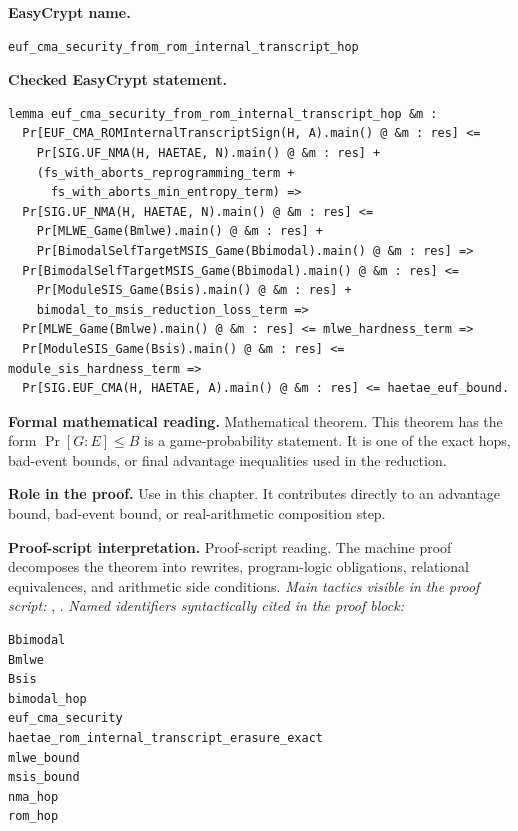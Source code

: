 \begin{formaltheorem}
\noindent\textbf{EasyCrypt name.}
\begin{lstlisting}[language=EasyCrypt,basicstyle=\ttfamily\scriptsize]
euf_cma_security_from_rom_internal_transcript_hop
\end{lstlisting}
\noindent\textbf{Checked EasyCrypt statement.}
\begin{lstlisting}[language=EasyCrypt,basicstyle=\ttfamily\scriptsize]
lemma euf_cma_security_from_rom_internal_transcript_hop &m :
  Pr[EUF_CMA_ROMInternalTranscriptSign(H, A).main() @ &m : res] <=
    Pr[SIG.UF_NMA(H, HAETAE, N).main() @ &m : res] +
    (fs_with_aborts_reprogramming_term +
      fs_with_aborts_min_entropy_term) =>
  Pr[SIG.UF_NMA(H, HAETAE, N).main() @ &m : res] <=
    Pr[MLWE_Game(Bmlwe).main() @ &m : res] +
    Pr[BimodalSelfTargetMSIS_Game(Bbimodal).main() @ &m : res] =>
  Pr[BimodalSelfTargetMSIS_Game(Bbimodal).main() @ &m : res] <=
    Pr[ModuleSIS_Game(Bsis).main() @ &m : res] +
    bimodal_to_msis_reduction_loss_term =>
  Pr[MLWE_Game(Bmlwe).main() @ &m : res] <= mlwe_hardness_term =>
  Pr[ModuleSIS_Game(Bsis).main() @ &m : res] <= module_sis_hardness_term =>
  Pr[SIG.EUF_CMA(H, HAETAE, A).main() @ &m : res] <= haetae_euf_bound.
\end{lstlisting}
\noindent\textbf{Formal mathematical reading.}
Mathematical theorem. This theorem has the form \(\Pr[G:E] \le B\) is a game-probability statement.  It is one of the exact hops, bad-event bounds, or final advantage inequalities used in the reduction.

\noindent\textbf{Role in the proof.}
Use in this chapter. It contributes directly to an advantage bound, bad-event bound, or real-arithmetic composition step.

\noindent\textbf{Proof-script interpretation.}
Proof-script reading. The machine proof decomposes the theorem into rewrites, program-logic obligations, relational equivalences, and arithmetic side conditions.
\emph{Main tactics visible in the proof script:} , .
\emph{Named identifiers syntactically cited in the proof block:}
\begin{lstlisting}[language=EasyCrypt,basicstyle=\ttfamily\scriptsize]
Bbimodal
Bmlwe
Bsis
bimodal_hop
euf_cma_security
haetae_rom_internal_transcript_erasure_exact
mlwe_bound
msis_bound
nma_hop
rom_hop
\end{lstlisting}

\end{formaltheorem}

